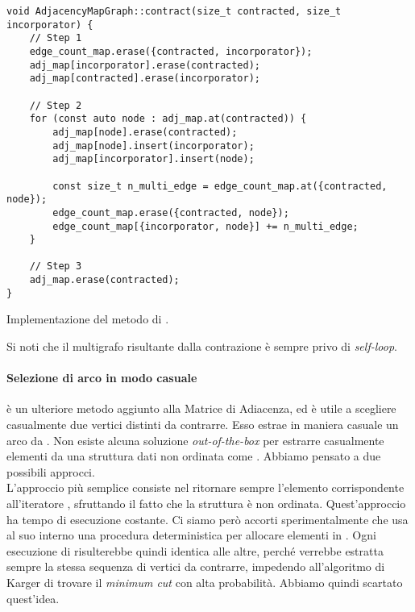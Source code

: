 \begin{listing}[!ht]
\begin{verbatim}
void AdjacencyMapGraph::contract(size_t contracted, size_t incorporator) {
    // Step 1
    edge_count_map.erase({contracted, incorporator});
    adj_map[incorporator].erase(contracted);
    adj_map[contracted].erase(incorporator);

    // Step 2
    for (const auto node : adj_map.at(contracted)) {
        adj_map[node].erase(contracted);
        adj_map[node].insert(incorporator);
        adj_map[incorporator].insert(node);

        const size_t n_multi_edge = edge_count_map.at({contracted, node});
        edge_count_map.erase({contracted, node});
        edge_count_map[{incorporator, node}] += n_multi_edge;
    }

    // Step 3
    adj_map.erase(contracted);
}
\end{verbatim}
\caption{Implementazione del metodo  di .}
\label{listing:met-contract}
\end{listing}

Si noti che il multigrafo risultante dalla contrazione è sempre privo di \textit{self-loop}.

\paragraph{Selezione di arco in modo casuale}

 è un ulteriore metodo aggiunto alla Matrice di Adiacenza, ed è utile a scegliere casualmente due vertici distinti da contrarre. Esso estrae in maniera casuale un arco da .
Non esiste alcuna soluzione \textit{out-of-the-box} per estrarre casualmente elementi da una struttura dati non ordinata come . Abbiamo pensato a due possibili approcci. \\

\noindent L'approccio più semplice consiste nel ritornare sempre l'elemento corrispondente all'iteratore , sfruttando il fatto che la struttura è non ordinata. Quest'approccio ha tempo di esecuzione costante.
Ci siamo però accorti sperimentalmente che  usa al suo interno una procedura deterministica per allocare elementi in . Ogni esecuzione di  risulterebbe quindi identica alle altre, perché verrebbe estratta sempre la stessa sequenza di vertici da contrarre, impedendo all'algoritmo di Karger di trovare il \textit{minimum cut} con alta probabilità. Abbiamo quindi scartato quest'idea. \\

